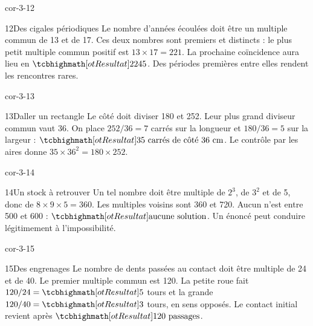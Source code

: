 \begin{blocLivre}{cor-3-12}\begin{corrige}{12}{Des cigales périodiques}
Le nombre d’années écoulées doit être un multiple commun de 13 et de 17. Ces deux nombres sont premiers et distincts : le plus petit multiple commun positif est $13\times17=221$. La prochaine coïncidence aura lieu en $\res{2245}$. Des périodes premières entre elles rendent les rencontres rares.
\end{corrige}\end{blocLivre}
\begin{blocLivre}{cor-3-13}\begin{corrige}{13}{Daller un rectangle}
Le côté doit diviser 180 et 252. Leur plus grand diviseur commun vaut 36. On place $252/36=7$ carrés sur la longueur et $180/36=5$ sur la largeur : $\res{35\text{ carrés de côté }36\text{ cm}}$. Le contrôle par les aires donne $35\times36^2=180\times252$.
\label{fig-cor-3-13}
\end{corrige}\end{blocLivre}
\begin{blocLivre}{cor-3-14}\begin{corrige}{14}{Un stock à retrouver}
Un tel nombre doit être multiple de $2^3$, de $3^2$ et de 5, donc de $8\times9\times5=360$. Les multiples voisins sont 360 et 720. Aucun n’est entre 500 et 600 : $\res{\text{aucune solution}}$. Un énoncé peut conduire légitimement à l’impossibilité.
\end{corrige}\end{blocLivre}
\begin{blocLivre}{cor-3-15}\begin{corrige}{15}{Des engrenages}
Le nombre de dents passées au contact doit être multiple de 24 et de 40. Le premier multiple commun est 120. La petite roue fait $120/24=\res5$ tours et la grande $120/40=\res3$ tours, en sens opposés. Le contact initial revient après $\res{120\text{ passages}}$.
\label{fig-cor-3-15}
\end{corrige}\end{blocLivre}
